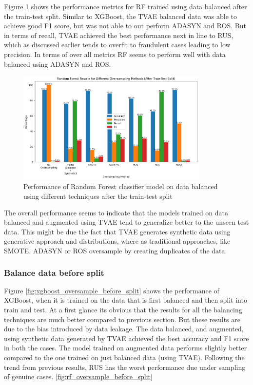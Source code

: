 \documentclass[twoside,11pt]{article}
\begin{document}
\begin{keywords}
Figure \ref{fig:rf_oversample_after_split} shows the performance metrics for RF trained using data balanced after the train-test split. Similar to XGBoost, the TVAE balanced data was able to achieve good F1 score, but was not able to out perform ADASYN and ROS. But in terms of recall, TVAE achieved the best performance next in line to RUS, which as discussed earlier tends to overfit to fraudulent cases leading to low precision. In terms of over all metrics RF seems to perform well with data balanced using ADASYN and ROS.
\begin{figure}
  \centering
  \includegraphics[width=0.85\textwidth]{images/rf_oversample_after_split.png}
  \caption{Performance of Random Forest classifier model on data balanced using different techniques after the train-test split}
  \label{fig:rf_oversample_after_split}
\end{figure}
The overall performance seems to indicate that the models trained on data balanced and augmented using TVAE tend to generalize better to the unseen test data. This might be due the fact that TVAE generates synthetic data using generative approach and distributions, where as traditional approaches, like SMOTE, ADASYN or ROS oversample by creating duplicates of the data.

\subsubsection{Balance data before split} \label{sec:beforeSplit}
Figure \ref{fig:xgboost_oversample_before_split} shows the performance of XGBoost, when it is trained on the data that is first balanced and then split into train and test. At a first glance its obvious that the results for all the balancing techniques are much better compared to previous section. But these results are due to the bias introduced by data leakage. The data balanced, and augmented, using synthetic data generated by TVAE achieved the best accuracy and F1 score in both the cases. The model trained on augmented data performs slightly better compared to the one trained on just balanced data (using TVAE). Following the trend from previous results, RUS has the worst performance due under sampling of genuine cases.
\ref{fig:rf_oversample_before_split}


\end{keywords}
\end{document}
